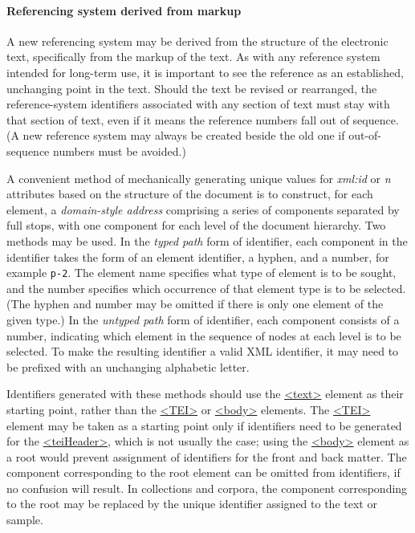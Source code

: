 \paragraph[{Referencing system derived from markup}]{Referencing system derived from markup}\label{CORS2-1}\par
A new referencing system may be derived from the structure of the electronic text, specifically from the markup of the text. As with any reference system intended for long-term use, it is important to see the reference as an established, unchanging point in the text. Should the text be revised or rearranged, the reference-system identifiers associated with any section of text must stay with that section of text, even if it means the reference numbers fall out of sequence. (A new reference system may always be created beside the old one if out-of-sequence numbers must be avoided.) \par
A convenient method of mechanically generating unique values for {\itshape xml:id} or {\itshape n} attributes based on the structure of the document is to construct, for each element, a \textit{domain-style address} comprising a series of components separated by full stops, with one component for each level of the document hierarchy. Two methods may be used. In the \textit{typed path} form of identifier, each component in the identifier takes the form of an element identifier, a hyphen, and a number, for example \texttt{p-2}. The element name specifies what type of element is to be sought, and the number specifies which occurrence of that element type is to be selected. (The hyphen and number may be omitted if there is only one element of the given type.) In the \textit{untyped path} form of identifier, each component consists of a number, indicating which element in the sequence of nodes at each level is to be selected. To make the resulting identifier a valid XML identifier, it may need to be prefixed with an unchanging alphabetic letter.\par
Identifiers generated with these methods should use the \hyperref[TEI.text]{<text>} element as their starting point, rather than the \hyperref[TEI.TEI]{<TEI>} or \hyperref[TEI.body]{<body>} elements. The \hyperref[TEI.TEI]{<TEI>} element may be taken as a starting point only if identifiers need to be generated for the \hyperref[TEI.teiHeader]{<teiHeader>}, which is not usually the case; using the \hyperref[TEI.body]{<body>} element as a root would prevent assignment of identifiers for the front and back matter. The component corresponding to the root element can be omitted from identifiers, if no confusion will result. In collections and corpora, the component corresponding to the root may be replaced by the unique identifier assigned to the text or sample.\par

